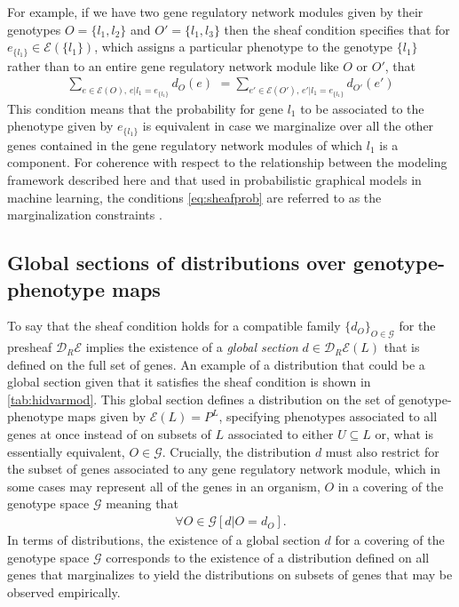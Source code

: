 For example, if we have two gene regulatory network modules given by their genotypes $O = \{l_1, l_2\}$ and $O' = \{l_1, l_3\}$ then the sheaf condition specifies that for $e_{\{l_1\}} \in \mathcal{E}(\{l_1\})$, which assigns a particular phenotype to the genotype $\{l_1\}$ rather than to an entire gene regulatory network module like $O$ or $O'$, that
\begin{eqnarray}\label{eq:sheafprob}
\sum_{e \in \mathcal{E}(O),\, e|l_1=e_{\{l_1\}}} d_O(e) \,\, = \sum_{e' \in \mathcal{E}(O'),\, e'|l_1=e_{\{l_1\}}} d_{O'}(e')
\end{eqnarray}
This condition means that the probability for gene $l_1$ to be associated to the phenotype given by $e_{\{l_1\}}$ is equivalent in case we marginalize over all the other genes contained in the gene regulatory network modules of which $l_1$ is a component. For coherence with respect to the relationship between the modeling framework described here and that used in probabilistic graphical models in machine learning, the conditions \ref{eq:sheafprob} are referred to as the marginalization constraints \cite{Wainwright2007}.

\subsection{Global sections of distributions over genotype-phenotype maps}
To say that the sheaf condition holds for a compatible family $\{d_O\}_{O \in \mathcal{G}}$ for the presheaf $\mathcal{D}_R\mathcal{E}$ implies the existence of a \emph{global section} $d \in \mathcal{D}_R\mathcal{E}(L)$ that is defined on the full set of genes. An example of a distribution that could be a global section given that it satisfies the sheaf condition is shown in \ref{tab:hidvarmod}. This global section defines a distribution on the set of genotype-phenotype maps given by $\mathcal{E}(L) = P^L$, specifying phenotypes associated to all genes at once instead of on subsets of $L$ associated to either $U \subseteq L$ or, what is essentially equivalent, $O \in \mathcal{G}$. Crucially, the distribution $d$ must also restrict for the subset of genes associated to any gene regulatory network module, which in some cases may represent all of the genes in an organism, $O$ in a covering of the genotype space $\mathcal{G}$ meaning that
\begin{eqnarray}
\forall O \in \mathcal{G} \left[ d|O = d_O \right].
\end{eqnarray}
In terms of distributions, the existence of a global section $d$ for a covering of the genotype space $\mathcal{G}$ corresponds to the existence of a distribution defined on all genes that marginalizes to yield the distributions on subsets of genes that may be observed empirically.

